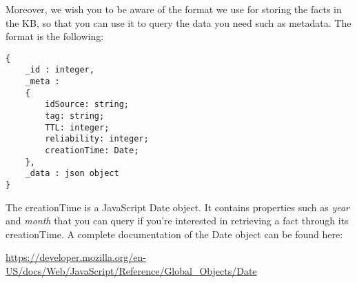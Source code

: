\documentclass{article}
\begin{document}
Moreover, we wish you to be aware of the format we use for storing the facts in the KB, so that you can use it to query the data you need such as metadata. The format is the following:

\begin{lstlisting}
{
	_id : integer,
	_meta : 
	{
		idSource: string;
		tag: string;
		TTL: integer;
		reliability: integer;
		creationTime: Date;
	},
	_data : json object
}
\end{lstlisting}


The creationTime is a JavaScript Date object. It contains properties such as \textit{year} and \textit{month} that you can query if you're interested in retrieving a fact through its creationTime. A complete documentation of the Date object can be found here:

\url{https://developer.mozilla.org/en-US/docs/Web/JavaScript/Reference/Global_Objects/Date}
\end{document}
